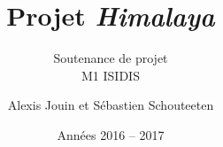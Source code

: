 \documentclass{beamer}
\newcommand{\himalaya}{\emph{Himalaya} }
\begin{document}
	\title{\textbf{Projet \himalaya}}
	\subtitle{Soutenance de projet\\
		{\footnotesize M1 ISIDIS}}
	\author {Alexis Jouin et Sébastien Schouteeten}
	\date{Années 2016 -- 2017}
	\frame[plain]{
		\titlepage
	}

	
	
	
	
	
	
	
	
	
	
	
	
	
	
\end{document}

